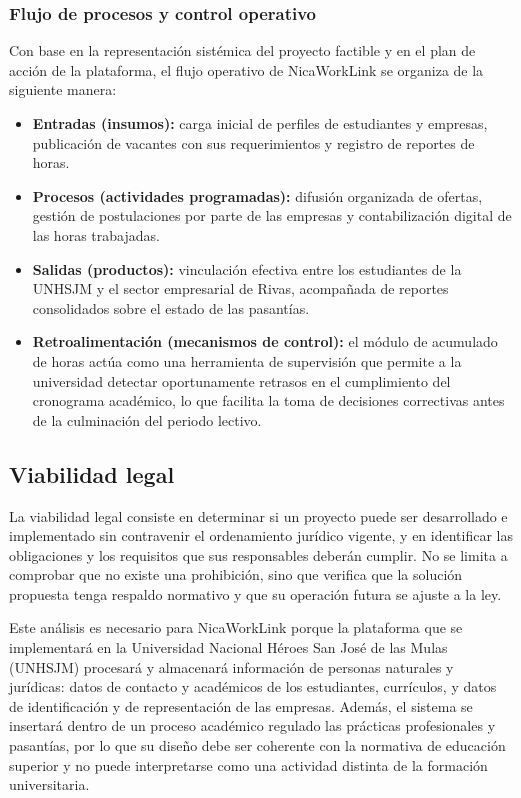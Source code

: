 \subsubsection{Flujo de procesos y control operativo}

Con base en la representación sistémica del proyecto factible \parencite{dubsdemoya2002} y en el plan de acción de la plataforma, el flujo operativo de NicaWorkLink se organiza de la siguiente manera:

\begin{itemize}
	\item \textbf{Entradas (insumos):} carga inicial de perfiles de estudiantes y empresas, publicación de vacantes con sus requerimientos y registro de reportes de horas.
	\item \textbf{Procesos (actividades programadas):} difusión organizada de ofertas, gestión de postulaciones por parte de las empresas y contabilización digital de las horas trabajadas.
	\item \textbf{Salidas (productos):} vinculación efectiva entre los estudiantes de la UNHSJM y el sector empresarial de Rivas, acompañada de reportes consolidados sobre el estado de las pasantías.
	\item \textbf{Retroalimentación (mecanismos de control):} el módulo de acumulado de horas actúa como una herramienta de supervisión que permite a la universidad detectar oportunamente retrasos en el cumplimiento del cronograma académico, lo que facilita la toma de decisiones correctivas antes de la culminación del periodo lectivo.
\end{itemize}

\newpage

\subsection{Viabilidad legal}

La viabilidad legal consiste en determinar si un proyecto puede ser desarrollado e implementado sin contravenir el ordenamiento jurídico vigente, y en identificar las obligaciones y los requisitos que sus responsables deberán cumplir. No se limita a comprobar que no existe una prohibición, sino que verifica que la solución propuesta tenga respaldo normativo y que su operación futura se ajuste a la ley.

Este análisis es necesario para NicaWorkLink porque la plataforma que se implementará en la Universidad Nacional Héroes San José de las Mulas (UNHSJM) procesará y almacenará información de personas naturales y jurídicas: datos de contacto y académicos de los estudiantes, currículos, y datos de identificación y de representación de las empresas. Además, el sistema se insertará dentro de un proceso académico regulado las prácticas profesionales y pasantías, por lo que su diseño debe ser coherente con la normativa de educación superior y no puede interpretarse como una actividad distinta de la formación universitaria.

